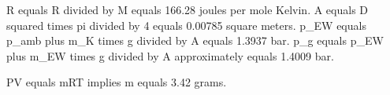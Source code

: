 R equals R divided by M equals 166.28 joules per mole Kelvin.  
A equals D squared times pi divided by 4 equals 0.00785 square meters.  
p_EW equals p_amb plus m_K times g divided by A equals 1.3937 bar.  
p_g equals p_EW plus m_EW times g divided by A approximately equals 1.4009 bar.  

PV equals mRT implies m equals 3.42 grams.